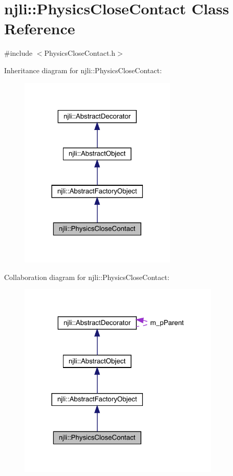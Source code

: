 \hypertarget{classnjli_1_1_physics_close_contact}{}\section{njli\+:\+:Physics\+Close\+Contact Class Reference}
\label{classnjli_1_1_physics_close_contact}


{\ttfamily \#include $<$Physics\+Close\+Contact.\+h$>$}



Inheritance diagram for njli\+:\+:Physics\+Close\+Contact\+:\nopagebreak
\begin{figure}[H]
\begin{center}
\leavevmode
\includegraphics[width=213pt]{classnjli_1_1_physics_close_contact__inherit__graph}
\end{center}
\end{figure}


Collaboration diagram for njli\+:\+:Physics\+Close\+Contact\+:\nopagebreak
\begin{figure}[H]
\begin{center}
\leavevmode
\includegraphics[width=273pt]{classnjli_1_1_physics_close_contact__coll__graph}
\end{center}
\end{figure}
